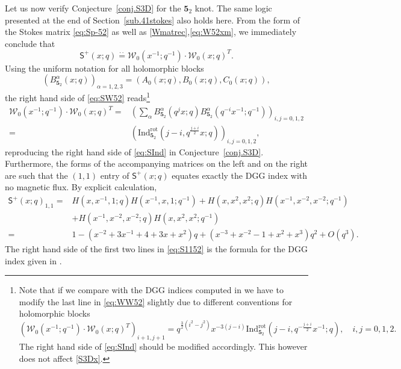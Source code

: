 \documentclass[12pt,reqno]{amsart}
\theoremstyle{definition}
\def\md{\mathbf}
\def\ms{\mathsf}
\def\cW{\mathcal{W}}
\newcommand{\knot}[1]{\md{#1}}
\newcommand{\nn}{\nonumber \\}
\begin{document}
Let us now verify Conjecture~\ref{conj.S3D} for the $\knot{5}_2$ knot.
The same logic presented at the end of Section~\ref{sub.41stokes} also
holds here.
From the form of the Stokes matrix \eqref{eq:Sp-52} as well as
\eqref{Wmatrec},\eqref{eq:W52xm}, we immediately conclude that
\begin{equation}
  \ms{S}^+(x;q) \stackrel{\cdot\cdot}{=} \cW_{0}(x^{-1};q^{-1})\cdot
  \cW_{0}(x;q)^T.
  \label{eq:SW52}
\end{equation}
Using the uniform notation for all holomorphic blocks
\begin{equation}
  (B_{\knot{5}_2}^\alpha(x;q))_{\alpha=1,2,3} = (A_0(x;q),B_0(x;q),C_0(x;q)),
\end{equation}
the right hand side of \eqref{eq:SW52} reads\footnote{Note that if we
  compare with the DGG indices computed in \cite{Beem} we have to
  modify the last line in \eqref{eq:WW52} slightly due to different
  conventions for holomorphic blocks 
  \begin{equation}
    \left(\cW_{0}(x^{-1};q^{-1})\cdot \cW_{0}(x;q)^T\right)_{i+1,j+1} =
    q^{\frac{3}{2}(i^2-j^2)}x^{-3(j-i)}
    \text{Ind}_{\knot{5}_2}^{\text{rot}}
    (j-i,q^{-\frac{j+i}{2}}x^{-1};q),\quad i,j=0,1,2.
  \end{equation}
  The right hand side of \eqref{eq:SInd} should be modified
  accordingly.  This however does not affect \eqref{S3Dx}.} 
\begin{align}
  \cW_{0}(x^{-1};q^{-1})\cdot \cW_{0}(x;q)^T =
  &\left(
    \sum_{\alpha}B^{\alpha}_{\knot{5}_2}(q^jx;q)
    B^{\alpha}_{\knot{5}_2}(q^{-i}x^{-1};q^{-1})
    \right)_{i,j=0,1,2}\nn = 
  &\left(
    \text{Ind}_{\knot{5}_2}^{\text{rot}}(j-i,q^{\frac{j+i}{2}}x;q)
    \right)_{i,j=0,1,2},
  \label{eq:WW52}
\end{align}
reproducing the right hand side of \eqref{eq:SInd} in
Conjecture~\ref{conj.S3D}.  Furthermore, the forms of the accompanying
matrices on the left and on the right are such that the $(1,1)$ entry
of $\ms{S}^+(x;q)$ equates exactly the DGG index with no magnetic
flux.  By explicit calculation,
%
\begin{align}
  \ms{S}^+(x;q)_{1,1} =
  &H(x,x^{-1},1;q)H(x^{-1},x,1;q^{-1})
    +H(x,x^2,x^2;q)H(x^{-1},x^{-2},x^{-2};q^{-1})\nn
  &+H(x^{-1},x^{-2},x^{-2};q)H(x,x^2,x^2;q^{-1})\nn=
  &1 -(x^{-2}+ 3x^{-1}+4+3 x + x^2) q + (x^{-3} + x^{-2} -1+ x^2 + 
    x^3) q^2 + O(q^3).
    \label{eq:S1152}
\end{align}
The right hand side of the first two lines in \eqref{eq:S1152} is the formula
for the DGG index given in \cite{Beem}.
\end{document}

